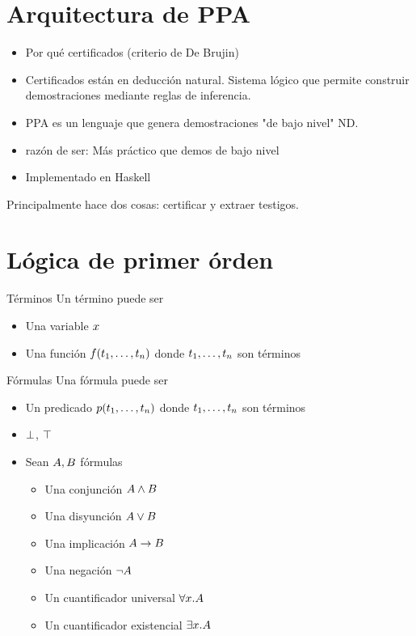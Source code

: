 \section{Arquitectura de PPA}

\begin{itemize}
    \item Por qué certificados (criterio de De Brujin)
    \item Certificados están en deducción natural. Sistema lógico que permite
    construir demostraciones mediante reglas de inferencia.
    \item PPA es un lenguaje que genera demostraciones "de bajo nivel" ND.
    \item razón de ser: Más práctico que demos de bajo nivel
    \item Implementado en Haskell
\end{itemize}

Principalmente hace dos cosas: certificar y extraer testigos.

\section{Lógica de primer órden}

\begin{definition}{Términos}
    Un término puede ser
    \begin{itemize}
        \item Una variable $x$
        \item Una función $f(t_1, \dots, t_n)$ donde $t_1, \dots,
        t_n$ son términos
    \end{itemize}
\end{definition}

\begin{definition}{Fórmulas}
    Una fórmula puede ser
    \begin{itemize}
        \item Un predicado $p(t_1, \dots, t_n)$ donde $t_1, \dots,
        t_n$ son términos
        \item $\bot$, $\top$
        \item Sean $A, B$ fórmulas
        \begin{itemize}
            \item Una conjunción $A \wedge B$
            \item Una disyunción $A \vee B$
            \item Una implicación $A \to B$
            \item Una negación $\neg A$
            \item Un cuantificador universal $\forall x . A$
            \item Un cuantificador existencial $\exists x . A$
        \end{itemize}
    \end{itemize}
\end{definition}

